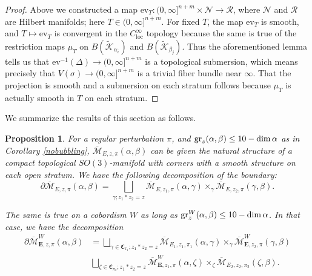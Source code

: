 \documentclass[10pt,a4paper]{amsart}
\newtheorem{proposition}[theorem]{Proposition}
\theoremstyle{definition}
\theoremstyle{remark}
\numberwithin{figure}{qchap}
\begin{document}
\begin{proof}Above we constructed a map $\text{ev}_T:  (0,\infty]^{n+m} \times \mathcal N \to \mathcal R$, where $\mathcal N$ and $\mathcal R$ are Hilbert manifolds; here $T \in (0,\infty]^{n+m}$. For fixed $T$, the map $\text{ev}_T$ is smooth, and $T \mapsto \text{ev}_T$ is convergent in the $C^\infty_\text{loc}$ topology because the same is true of the restriction maps $\mu_T$ on $B(\widetilde{\mathcal K}_{\alpha_i})$ and $B(\widetilde{\mathcal K}_{\beta_j})$. Thus the aforementioned lemma tells us that $\text{ev}^{-1}(\Delta) \to (0,\infty]^{n+m}$ is a topological submersion, which means precisely that $V(\sigma) \to (0,\infty]^{n+m}$ is a trivial fiber bundle near $\infty$. That the projection is smooth and a submersion on each stratum follows because $\mu_T$ is actually smooth in $T$ on each stratum.
\end{proof}

We summarize the results of this section as follows.

\begin{proposition}\label{gluing}For a regular perturbation $\pi$, and $\textup{gr}_z(\alpha, \beta) \leq 10 - \dim \alpha$ as in Corollary \ref{nobubbling}, $\overline{\mathcal M}_{E,z,\pi}(\alpha,\beta)$ can be given the natural structure of a compact topological $SO(3)$-manifold with corners with a smooth structure on each open stratum. We have the following decomposition of the boundary: $$\partial \overline{\mathcal M}_{E,z,\pi}(\alpha, \beta) = \bigsqcup_{\gamma; z_1 \ast z_2 = z} \overline{\mathcal M}_{E,z_1,\pi}(\alpha, \gamma) \times_\gamma \overline{\mathcal M}_{E,z_2,\pi}(\gamma, \beta).$$

The same is true on a cobordism $W$ as long as $\textup{gr}^W_z(\alpha, \beta) \leq 10 - \dim \alpha$. In that case, we have the decomposition
\begin{align*}\partial \overline{\mathcal M}^W_{\mathbf E,z,\pi}(\alpha, \beta) &= \bigsqcup_{\gamma \in \mathfrak C_{\pi_1}; z_1 \ast z_2 = z} \overline{\mathcal M}_{E_1,z_1,\pi_1}(\alpha, \gamma) \times_\gamma \overline{\mathcal M}^W_{\mathbf{E},z_2,\pi}(\gamma, \beta)\\
&\bigsqcup_{\zeta \in \mathfrak C_{\pi_2}; z_1 \ast z_2 = z} \overline{\mathcal M}^W_{\mathbf{E},z_1,\pi} (\alpha, \zeta) \times_\zeta \overline{\mathcal M}_{E_2,z_2,\pi_2}(\zeta, \beta).
\end{align*}
\end{proposition}
\end{document}
